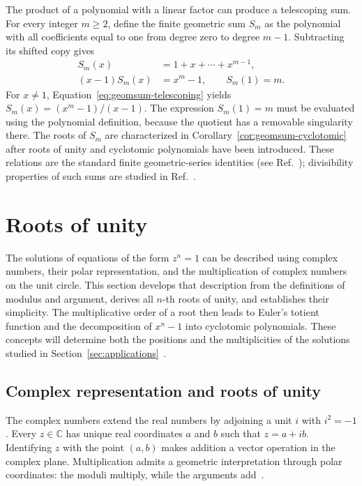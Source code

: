 \documentclass[11pt,a4paper]{article}
\numberwithin{equation}{section}
\theoremstyle{uprightpaper}
\newcommand{\C}{\mathbb{C}}
\begin{document}
The product of a polynomial with a linear factor can produce a telescoping sum. For every integer $m\ge 2$, define the finite geometric sum $S_m$ as the polynomial with all coefficients equal to one from degree zero to degree $m-1$. Subtracting its shifted copy gives
\begin{align}
 S_m(x)&=1+x+\cdots+x^{m-1},\label{eq:geomsum-basic}\\
 (x-1)S_m(x)&=x^m-1,\qquad S_m(1)=m.\label{eq:geomsum-telescoping}
\end{align}
For $x\ne1$, Equation~\eqref{eq:geomsum-telescoping} yields $S_m(x)=(x^m-1)/(x-1)$. The expression $S_m(1)=m$ must be evaluated using the polynomial definition, because the quotient has a removable singularity there. The roots of $S_m$ are characterized in Corollary~\ref{cor:geomsum-cyclotomic} after roots of unity and cyclotomic polynomials have been introduced. These relations are the standard finite geometric-series identities (see Ref.~\cite{barbeau1989}); divisibility properties of such sums are studied in Ref.~\cite{hartwig2023divisibility}.

\section{Roots of unity}\label{sec:rootsunity}

The solutions of equations of the form $z^n=1$ can be described using complex numbers, their polar representation, and the multiplication of complex numbers on the unit circle. This section develops that description from the definitions of modulus and argument, derives all $n$-th roots of unity, and establishes their simplicity. The multiplicative order of a root then leads to Euler's totient function and the decomposition of $x^n-1$ into cyclotomic polynomials. These concepts will determine both the positions and the multiplicities of the solutions studied in Section~\ref{sec:applications}~\cite{andreescu2014,needham1997,irelandrosen1990}.

\subsection{Complex representation and roots of unity}\label{subsec:complex-roots}

The complex numbers extend the real numbers by adjoining a unit $i$ with $i^2=-1$. Every $z\in\C$ has unique real coordinates $a$ and $b$ such that $z=a+ib$. Identifying $z$ with the point $(a,b)$ makes addition a vector operation in the complex plane. Multiplication admits a geometric interpretation through polar coordinates: the moduli multiply, while the arguments add~\cite{needham1997,andreescu2014}.
\end{document}
